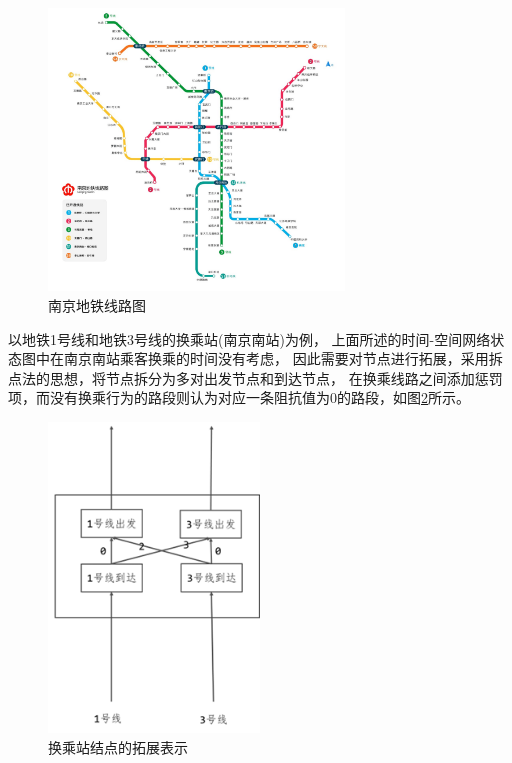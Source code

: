 \begin{figure}[H] %
    \centering %
    \includegraphics[width=0.7\textwidth]{png/图片9 南京地铁线路图} %
    \caption{南京地铁线路图} %
    \label{fig:fig9} %
\end{figure}

以地铁1号线和地铁3号线的换乘站(南京南站)为例，
上面所述的时间-空间网络状态图中在南京南站乘客换乘的时间没有考虑，
因此需要对节点进行拓展，采用拆点法的思想，将节点拆分为多对出发节点和到达节点，
在换乘线路之间添加惩罚项，而没有换乘行为的路段则认为对应一条阻抗值为0的路段，如图\ref{fig:fig10}所示。

\begin{figure}[H] %
    \centering %
    \includegraphics[width=0.5\textwidth]{png/图片10 换乘站结点的拓展表示} %
    \caption{换乘站结点的拓展表示} %
    \label{fig:fig10} %
\end{figure}

